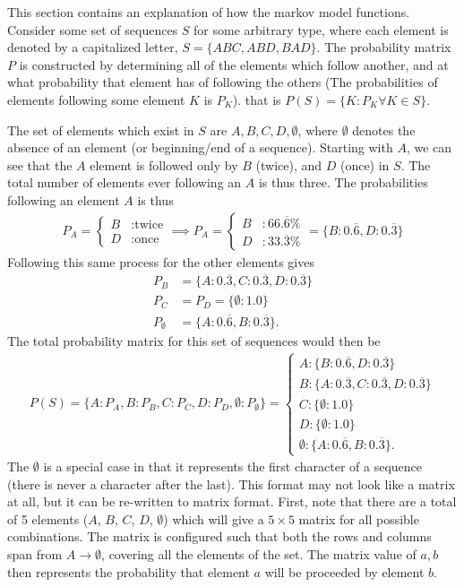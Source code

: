This section contains an explanation of how the markov model functions. Consider some set of sequences $S$ for some arbitrary type, where each element is denoted by a capitalized letter, $S=\{ABC, ABD, BAD\}$. The probability matrix $P$ is constructed by determining all of the elements which follow another, and at what probability that element has of following the others (The probabilities of elements following some element $K$ is $P_K$). that is $P(S) = \{K:P_K \forall K \in S\}$.

The set of elements which exist in $S$ are ${A, B, C, D, \emptyset}$, where $\emptyset$ denotes the absence of an element (or beginning/end of a sequence). Starting with $A$, we can see that the $A$ element is followed only by $B$ (twice), and $D$ (once) in $S$. The total number of elements ever following an $A$ is thus three. The probabilities following an element $A$ is thus
\begin{align}
P_A = \begin{cases}
  B & :\text{twice} \\
  D & :\text{once}
\end{cases} \implies P_A = \begin{cases}
  B & : 66.\overline{6}\% \\
  D & : 33.\overline{3}\%
\end{cases} = \{B:0.\overline{6}, D:0.\overline{3}\}
\end{align}
Following this same process for the other elements gives
\begin{align}
P_B &= \{A:0.\overline{3}, C:0.\overline{3}, D:0.\overline{3}\} \\ P_C &= P_D = \{\emptyset:1.0\}\\ P_\emptyset &= \{A:0.\overline{6}, B:0.\overline{3}\}.
\end{align}
The total probability matrix for this set of sequences would then be
\begin{align}
P(S) = \{A:P_A, B:P_B, C:P_C, D:P_D, \emptyset: P_\emptyset\} = \begin{cases}
A:\{B:0.\overline{6}, D:0.\overline{3}\} \\
B: \{A:0.\overline{3}, C:0.\overline{3}, D:0.\overline{3}\} \\
C: \{\emptyset:1.0\} \\
D: \{\emptyset:1.0\} \\
\emptyset: \{A:0.\overline{6}, B:0.\overline{3}\}.
\end{cases}
\end{align}
The $\emptyset$ is a special case in that it represents the first character of a sequence (there is never a character after the last). This format may not look like a matrix at all, but it can be re-written to matrix format. First, note that there are a total of 5 elements ($A$, $B$, $C$, $D$, $\emptyset$) which will give a $5 \times 5$ matrix for all possible combinations. The matrix is configured such that both the rows and columns span from $A\rightarrow\emptyset$, covering all the elements of the set. The matrix value of $a, b$ then represents the probability that element $a$ will be proceeded by element $b$.
